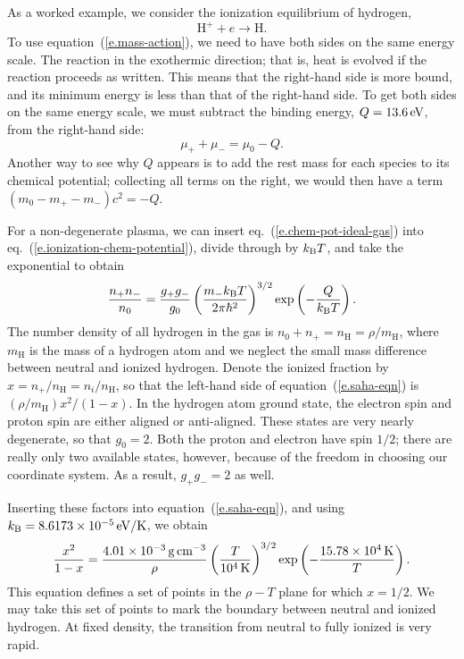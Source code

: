 As a worked example, we consider the ionization equilibrium of hydrogen,
\[ \mathrm{H^{+}} + e \to \mathrm{H}. \]
To use equation~(\ref{e.mass-action}), we need to have both sides on the same energy scale. The reaction in the exothermic direction; that is, heat is evolved if the reaction proceeds as written.  This means that the right-hand side is more bound, and its minimum energy is less than that of the right-hand side. To get both sides on the same energy scale, we must subtract the binding energy, $Q=13.6\,\mathrm{eV}$, from the right-hand side:
\begin{equation}\label{e.ionization-chem-potential}
\mu_{+} + \mu_{-}= \mu_{0} -  Q.
\end{equation}
Another way to see why $Q$ appears is to add the rest mass for each species to its chemical potential; collecting all terms on the right, we would then have a term $(m_{0}-m_{+}-m_{-})c^{2} = -Q$.

For a non-degenerate plasma, we can insert eq.~(\ref{e.chem-pot-ideal-gas}) into eq.~(\ref{e.ionization-chem-potential}), divide through by $k_\mathrm{B} T$, and take the exponential to obtain
\begin{equation}\label{e.saha-eqn}
\frac{n_{+}n_{-}}{n_{0}} = \frac{g_{+}g_{-}}{g_{0}}\left(\frac{m_{-}k_\mathrm{B} T}{2\pi\hbar^{2}}\right)^{3/2}\exp\left(-\frac{Q}{k_\mathrm{B} T}\right).
\end{equation}
The number density of all hydrogen in the gas is $n_{0}+n_{+} = n_{\mathrm{H}} = \rho/m_{\mathrm{H}}$, where $m_{\mathrm{H}}$ is the mass of a hydrogen atom and we neglect the small mass difference between neutral and ionized hydrogen.  Denote the ionized fraction by $x = n_{+}/n_{\mathrm{H}} = n_{i}/n_{\mathrm{H}}$, so that the left-hand side of equation~(\ref{e.saha-eqn}) is $(\rho/m_{\mathrm{H}}) x^{2}/(1-x)$. In the hydrogen atom ground state, the electron spin and proton spin are either aligned or anti-aligned. These states are very nearly degenerate, so that $g_{0} = 2$.  Both the proton and electron have spin $1/2$; there are really only two available states, however, because of the freedom in choosing our coordinate system.  As a result, $g_{+}g_{-} = 2$ as well.

Inserting these factors into equation~(\ref{e.saha-eqn}), and using $k_\mathrm{B} = 8.6173\times 10^{-5}\,\mathrm{eV}/\mathrm{K}$, we obtain
\begin{equation}\label{e.saha-reduced}
\frac{x^{2}}{1-x} = \frac{4.01\times 10^{-3}\,\mathrm{g}\,{\mathrm{c}\mathrm{m}}^{-3}}{\rho} \left(\frac{T}{10^{4}\,\mathrm{K}}\right)^{3/2}\exp\left(-\frac{15.78\times 10^{4}\,\mathrm{K}}{T}\right).
\end{equation}
This equation defines a set of points in the $\rho-T$ plane for which $x = 1/2$.  We may take this set of points to mark the boundary between neutral and ionized hydrogen. At fixed density, the transition from neutral to fully ionized is very rapid.

